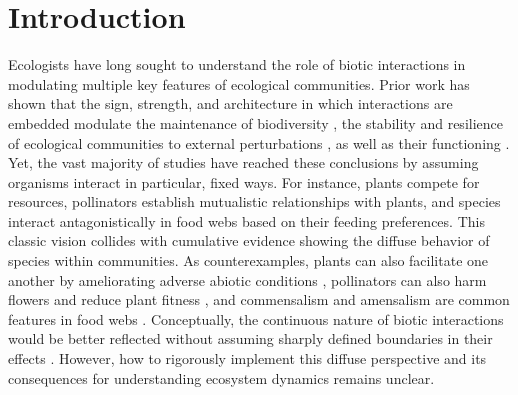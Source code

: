 \documentclass[12pt]{article}
\begin{document}
\clearpage

\section*{Introduction}

Ecologists have long sought to understand the role of biotic interactions in modulating multiple key features of ecological communities. Prior work has shown that the sign, strength, and architecture in which interactions are embedded modulate the maintenance of biodiversity \citep{Levine2009,Bascompte2006a,McCann2010,gellner2023}, the stability and resilience of ecological communities to external perturbations \citep{Mougi2012,Kondoh2015}, as well as their functioning \citep{Cardinale2011,Godoy2020}. Yet, the vast majority of studies have reached these conclusions by assuming organisms interact in particular, fixed ways. For instance, plants compete for resources, pollinators establish mutualistic relationships with plants, and species interact antagonistically in food webs based on their feeding preferences. This classic vision collides with cumulative evidence showing the diffuse behavior of species within communities. As counterexamples, plants can also facilitate one another by ameliorating adverse abiotic conditions \citep{brooker2008}, pollinators can also harm flowers and reduce plant fitness \citep{magrach2017}, and commensalism and amensalism are common features in food webs \citep{sanders2012}. Conceptually, the continuous nature of biotic interactions would be better reflected without assuming sharply defined boundaries in their effects \citep{Holland2009, Gomez2023, buche2025}. However, how to rigorously implement this diffuse perspective and its consequences for understanding ecosystem dynamics remains unclear.
\end{document}
